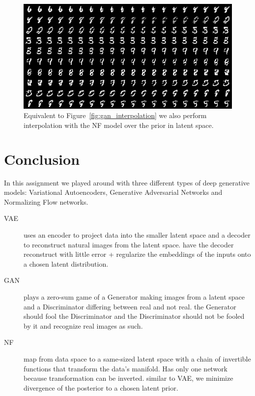 \documentclass{article}
\begin{document}
\begin{figure}
  \centering
  \includegraphics[width=0.9\linewidth]{assignment_3/code/figures/nf_interpolate.png}
  \caption{Equivalent to Figure~\ref{fig:gan_interpolation} we also perform interpolation with the NF model over the prior in latent space.}
  \label{fig:nf_interpolate}
\end{figure}

\section{Conclusion}
In this assignment we played around with three different types of deep generative models: Variational Autoencoders, Generative Adversarial Networks and Normalizing Flow networks.

\begin{description}
  \item[VAE] uses an encoder to project data into the smaller latent space and a decoder to reconstruct natural images from the latent space.  have the decoder reconstruct with little error + regularize the embeddings of the inputs onto a chosen latent distribution.
  \item[GAN] plays a zero-sum game of a Generator making images from a latent space and a Discriminator differing between real and not real.  the Generator should fool the Discriminator and the Discriminator should not be fooled by it and recognize real images as such.
  \item[NF] map from data space to a same-sized latent space with a chain of invertible functions that transform the data's manifold. Has only one network because transformation can be inverted.  similar to VAE, we minimize divergence of the posterior to a chosen latent prior.
\end{description}



\end{document}
